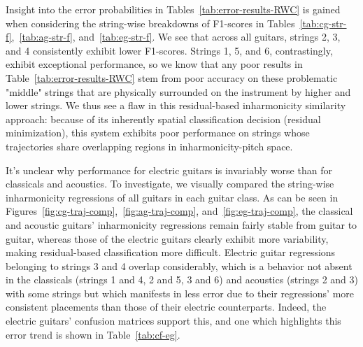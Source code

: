 \documentclass[12pt]{cmuthesis}
\begin{document}
Insight into the error probabilities in Tables~\ref{tab:error-results-RWC} is gained when considering the string-wise breakdowns of F1-scores in Tables~\ref{tab:cg-str-f},~\ref{tab:ag-str-f}, and~\ref{tab:eg-str-f}. We see that across all guitars, strings 2, 3, and 4 consistently exhibit lower F1-scores. Strings 1, 5, and 6, contrastingly, exhibit exceptional performance, so we know that any poor results in Table~\ref{tab:error-results-RWC} stem from poor accuracy on these problematic "middle" strings that are physically surrounded on the instrument by higher and lower strings. We thus see a flaw in this residual-based inharmonicity similarity approach: because of its inherently spatial classification decision (residual minimization), this system exhibits poor performance on strings whose trajectories share overlapping regions in inharmonicity-pitch space.

It's unclear why performance for electric guitars is invariably worse than for classicals and acoustics. To investigate, we visually compared the string-wise inharmonicity regressions of all guitars in each guitar class. As can be seen in Figures~\ref{fig:cg-traj-comp},~\ref{fig:ag-traj-comp}, and~\ref{fig:eg-traj-comp}, the classical and acoustic guitars' inharmonicity regressions remain fairly stable from guitar to guitar, whereas those of the electric guitars clearly exhibit more variability, making residual-based classification more difficult. Electric guitar regressions belonging to strings 3 and 4 overlap considerably, which is a behavior not absent in the classicals (strings 1 and 4, 2 and 5, 3 and 6) and acoustics (strings 2 and 3) with some strings but which manifests in less error due to their regressions' more consistent placements than those of their electric counterparts. Indeed, the electric guitars' confusion matrices support this, and one which highlights this error trend is shown in Table~\ref{tab:cf-eg}. 
\end{document}
